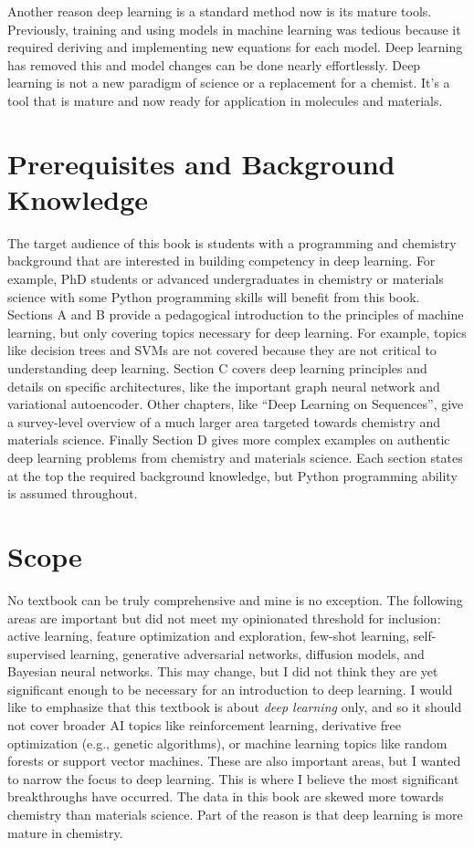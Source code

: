 \documentclass[9pt,pubversion,training]{livecoms}
\begin{document}
Another reason deep learning is a standard method now is its mature tools. Previously, training and using models in machine learning was tedious because it required deriving and implementing new equations for each model. Deep learning has removed this and model changes can be done nearly effortlessly. Deep learning is not a new paradigm of science or a replacement for a chemist. It's a tool that is mature and now ready for application in molecules and materials.

\section{Prerequisites and Background Knowledge}

The target audience of this book is students with a programming and chemistry background that are interested in building competency in deep learning. For example, PhD students or advanced undergraduates in chemistry or materials science with some Python programming skills will benefit from this book. Sections A and B provide a pedagogical introduction to the principles of machine learning, but only covering topics necessary for deep learning. For example, topics like decision trees and SVMs are not covered because they are not critical to understanding deep learning. Section C covers deep learning principles and details on specific architectures, like the important graph neural network and variational autoencoder. Other chapters, like ``Deep Learning on Sequences'', give a survey-level overview of a much larger area targeted towards chemistry and materials science. Finally Section D gives more complex examples on authentic deep learning problems from chemistry and materials science. Each section states at the top the required background knowledge, but Python programming ability is assumed throughout.

\section{Scope}
No textbook can be truly comprehensive and mine is no exception. The following areas are important but did not meet my opinionated threshold for inclusion: active learning, feature optimization and exploration, few-shot learning, self-supervised learning, generative adversarial networks, diffusion models, and Bayesian neural networks. This may change, but I did not think they are yet significant enough to be necessary for an introduction to deep learning. I would like to emphasize that this textbook is about \textit{deep learning} only, and so it should not cover broader AI topics like reinforcement learning, derivative free optimization (e.g., genetic algorithms), or machine learning topics like random forests or support vector machines. These are also important areas, but I wanted to narrow the focus to deep learning. This is where I believe the most significant breakthroughs have occurred. The data in this book are skewed more towards chemistry than materials science. Part of the reason is that deep learning is more mature in chemistry.
\end{document}
